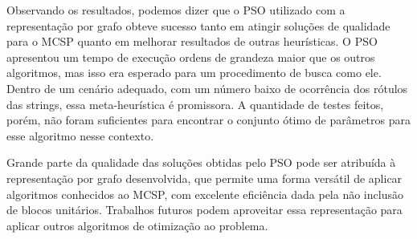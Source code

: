 Observando os resultados, podemos dizer que o PSO utilizado com a representação por grafo obteve sucesso tanto em atingir soluções de qualidade para o MCSP quanto em melhorar resultados de outras heurísticas. O PSO apresentou um tempo de execução ordens de grandeza maior que os outros algoritmos, mas isso era esperado para um procedimento de busca como ele. Dentro de um cenário adequado, com um número baixo de ocorrência dos rótulos das strings, essa meta-heurística é promissora. A quantidade de testes feitos, porém, não foram suficientes para encontrar o conjunto ótimo de parâmetros para esse algoritmo nesse contexto.

Grande parte da qualidade das soluções obtidas pelo PSO pode ser atribuída à representação por grafo desenvolvida, que permite uma forma versátil de aplicar algoritmos conhecidos ao MCSP, com excelente eficiência dada pela não inclusão de blocos unitários. Trabalhos futuros podem aproveitar essa representação para aplicar outros algoritmos de otimização ao problema.
